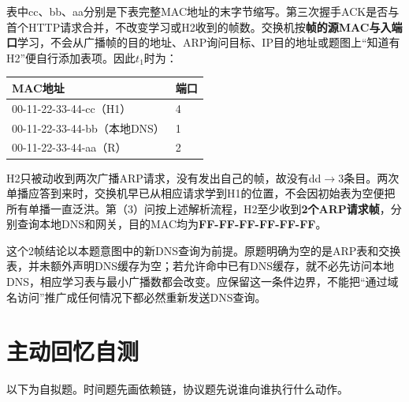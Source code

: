表中cc、bb、aa分别是下表完整MAC地址的末字节缩写。第三次握手ACK是否与首个HTTP请求合并，不改变学习或H2收到的帧数。交换机按\textbf{帧的源MAC与入端口}学习，不会从广播帧的目的地址、ARP询问目标、IP目的地址或题图上``知道有H2''便自行添加表项。因此\(t_1\)时为：

\begin{wideblock}

\par\medskip\noindent\begin{minipage}{\linewidth}\fontsize{9.3}{12}\selectfont\begin{tabularx}{\linewidth}{@{}YY@{}}
\toprule\noalign{}
MAC地址 & 端口 \\
\midrule\noalign{}


00-11-22-33-44-cc（H1） & 4 \\
00-11-22-33-44-bb（本地DNS） & 1 \\
00-11-22-33-44-aa（R） & 2 \\
\bottomrule\end{tabularx}
\end{minipage}\par\medskip

\end{wideblock}

H2只被动收到两次广播ARP请求，没有发出自己的帧，故没有dd\ensuremath{\to}3条目。两次单播应答到来时，交换机早已从相应请求学到H1的位置，不会因初始表为空便把所有单播一直泛洪。第（3）问按上述解析流程，H2至少收到\textbf{2个ARP请求帧}，分别查询本地DNS和网关，目的MAC均为\textbf{FF-FF-FF-FF-FF-FF}。

这个2帧结论以本题意图中的新DNS查询为前提。原题明确为空的是ARP表和交换表，并未额外声明DNS缓存为空；若允许命中已有DNS缓存，就不必先访问本地DNS，相应学习表与最小广播数都会改变。应保留这一条件边界，不能把``通过域名访问''推广成任何情况下都必然重新发送DNS查询。

\section{主动回忆自测}\label{CN06-review}

以下为自拟题。时间题先画依赖链，协议题先说谁向谁执行什么动作。


